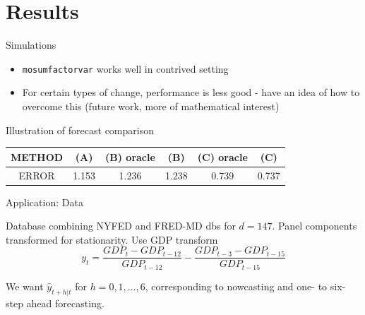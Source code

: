 \documentclass[11pt]{beamer}
\begin{document}
\section{Results}
\begin{frame}{Simulations}
\begin{itemize}
	\item \texttt{mosumfactorvar} works well in contrived setting
	\item For certain types of change, performance is less good - have an idea of how to overcome this (future work, more of mathematical interest) 
\end{itemize}

Illustration of forecast comparison
\begin{tabular}{c|c|c|c|c|c}
     METHOD &    (A) & (B) oracle    &     (B) & (C) oracle &         (C)  \\ \hline
   ERROR & 1.153    &  1.236   &   1.238    &  0.739     & 0.737  
\end{tabular}
\end{frame}

\begin{frame}{Application: Data}

Database combining NYFED and FRED-MD dbs for $d=147$. Panel components transformed for stationarity.
Use GDP transform 
$$y_t = \frac{GDP_t - GDP_{t-12}}{GDP_{t-12}} - \frac{GDP_{t-3} - GDP_{t-15}}{GDP_{t-15}} $$

We want $\hat{y}_{t+h|t}$ for $h=0, 1, \dots,6$, corresponding to nowcasting and one- to six-step ahead forecasting.
\end{frame}
\end{document}
